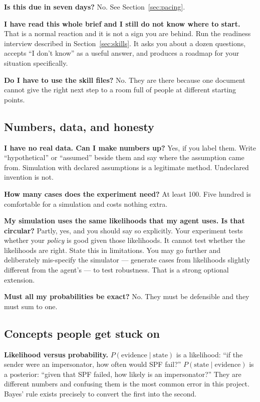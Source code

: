 \documentclass[11pt,a4paper]{article}
\begin{document}
\textbf{Is this due in seven days?} No. See Section~\ref{sec:pacing}.

\textbf{I have read this whole brief and I still do not know where to start.} That is a normal
reaction and it is not a sign you are behind. Run the readiness interview described in
Section~\ref{sec:skills}. It asks you about a dozen questions, accepts ``I don't know'' as a
useful answer, and produces a roadmap for your situation specifically.

\textbf{Do I have to use the skill files?} No. They are there because one document cannot give
the right next step to a room full of people at different starting points.

\subsection{Numbers, data, and honesty}

\textbf{I have no real data. Can I make numbers up?} Yes, if you label them. Write ``hypothetical''
or ``assumed'' beside them and say where the assumption came from. Simulation with declared
assumptions is a legitimate method. Undeclared invention is not.

\textbf{How many cases does the experiment need?} At least 100. Five hundred is comfortable for a
simulation and costs nothing extra.

\textbf{My simulation uses the same likelihoods that my agent uses. Is that circular?} Partly, yes,
and you should say so explicitly. Your experiment tests whether your \emph{policy} is good given
those likelihoods. It cannot test whether the likelihoods are right. State this in limitations.
You may go further and deliberately mis-specify the simulator --- generate cases from likelihoods
slightly different from the agent's --- to test robustness. That is a strong optional extension.

\textbf{Must all my probabilities be exact?} No. They must be defensible and they must sum to one.

\subsection{Concepts people get stuck on}

\textbf{Likelihood versus probability.} $P(\text{evidence} \mid \text{state})$ is a likelihood:
``if the sender were an impersonator, how often would SPF fail?'' $P(\text{state} \mid
\text{evidence})$ is a posterior: ``given that SPF failed, how likely is an impersonator?'' They
are different numbers and confusing them is the most common error in this project. Bayes' rule
exists precisely to convert the first into the second.
\end{document}

